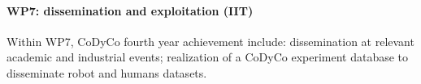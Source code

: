 

\paragraph*{WP7: dissemination and exploitation (IIT)}

Within WP7, CoDyCo fourth year achievement include: dissemination at relevant academic and industrial events; realization of a CoDyCo experiment database to disseminate robot and humans datasets. 